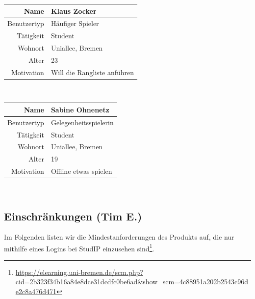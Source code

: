 \documentclass[fontsize=12pt,paper=a4,twoside]{scrartcl}
\begin{document}
    	\begin{tabular}{|r|p{}|}\hline
        \textbf{Name} &  \textbf{Klaus Zocker}\\\hline
       Benutzertyp & Häufiger Spieler \\\hline
       Tätigkeit	& Student\\\hline
       Wohnort & Uniallee, Bremen\\\hline
       Alter	 & 23\\\hline
       Motivation & Will die Rangliste anführen\\\hline
    \end{tabular}\\
    
    \begin{tabular}{|r|p{}|}\hline
        \textbf{Name} &  \textbf{Sabine Ohnenetz}\\\hline
       Benutzertyp & Gelegenheitsspielerin \\\hline
       Tätigkeit	& Student\\\hline
       Wohnort & Uniallee, Bremen\\\hline
       Alter	 & 19\\\hline
       Motivation & Offline etwas spielen \\\hline
    \end{tabular}\\
  
  \subsection{Einschränkungen (Tim E.)}\label{einschraenkungen}

Im Folgenden listen wir die Mindestanforderungen des Produkts auf, die nur mithilfe eines Logins bei StudIP einzusehen sind\footnote{\url{https://elearning.uni-bremen.de/scm.php?cid=2b323f34b16a84e8dce31dcdfc0be6ad\&show\_scm=4c88951a202b2543c96de2c8a476d471}}.
\end{document}

